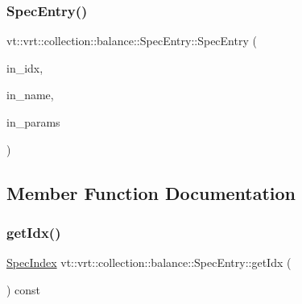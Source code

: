 \subsubsection{\texorpdfstring{Spec\+Entry()}{SpecEntry()}}
{\footnotesize\ttfamily vt\+::vrt\+::collection\+::balance\+::\+Spec\+Entry\+::\+Spec\+Entry (\begin{DoxyParamCaption}\item[{\hyperlink{namespacevt_1_1vrt_1_1collection_1_1balance_a72a5e0d9936ddf57f8e6c64e0e9fd123}{Spec\+Index} const}]{in\+\_\+idx,  }\item[{std\+::string const}]{in\+\_\+name,  }\item[{std\+::unordered\+\_\+map$<$ std\+::string, std\+::string $>$}]{in\+\_\+params }\end{DoxyParamCaption})\hspace{0.3cm}{\ttfamily [inline]}}



\subsection{Member Function Documentation}
\mbox{\label{structvt_1_1vrt_1_1collection_1_1balance_1_1_spec_entry_a665d82dc37723e5392d215973eb1e73b}} 
\subsubsection{\texorpdfstring{get\+Idx()}{getIdx()}}
{\footnotesize\ttfamily \hyperlink{namespacevt_1_1vrt_1_1collection_1_1balance_a72a5e0d9936ddf57f8e6c64e0e9fd123}{Spec\+Index} vt\+::vrt\+::collection\+::balance\+::\+Spec\+Entry\+::get\+Idx (\begin{DoxyParamCaption}{ }\end{DoxyParamCaption}) const\hspace{0.3cm}{\ttfamily [inline]}}

\mbox{\label{structvt_1_1vrt_1_1collection_1_1balance_1_1_spec_entry_a265df7d1bc8ac20e92c7799fd4973018}} 
